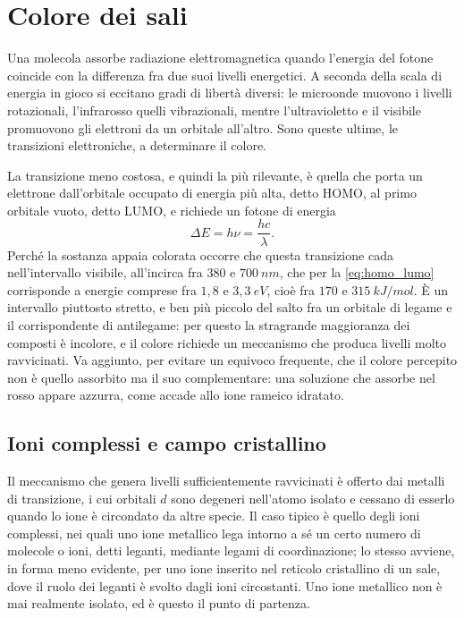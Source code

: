 \chapter{Colore dei sali}

Una molecola assorbe radiazione elettromagnetica quando l'energia del fotone coincide con la differenza fra due suoi livelli energetici.
A seconda della scala di energia in gioco si eccitano gradi di libertà diversi: le microonde muovono i livelli rotazionali, l'infrarosso quelli vibrazionali, mentre l'ultravioletto e il visibile promuovono gli elettroni da un orbitale all'altro.
Sono queste ultime, le transizioni elettroniche, a determinare il colore.

La transizione meno costosa, e quindi la più rilevante, è quella che porta un elettrone dall'orbitale occupato di energia più alta, detto HOMO, al primo orbitale vuoto, detto LUMO, e richiede un fotone di energia
\begin{equation}
    \Delta E = h\nu = \frac{hc}{\lambda} .
    \label{eq:homo_lumo}
\end{equation}
Perché la sostanza appaia colorata occorre che questa transizione cada nell'intervallo visibile, all'incirca fra $380$ e $700 \ nm$, che per la \eqref{eq:homo_lumo} corrisponde a energie comprese fra $1{,}8$ e $3{,}3 \ eV$, cioè fra $170$ e $315 \ kJ/mol$.
È un intervallo piuttosto stretto, e ben più piccolo del salto fra un orbitale di legame e il corrispondente di antilegame: per questo la stragrande maggioranza dei composti è incolore, e il colore richiede un meccanismo che produca livelli molto ravvicinati.
Va aggiunto, per evitare un equivoco frequente, che il colore percepito non è quello assorbito ma il suo complementare: una soluzione che assorbe nel rosso appare azzurra, come accade allo ione rameico idratato.

\section{Ioni complessi e campo cristallino}

Il meccanismo che genera livelli sufficientemente ravvicinati è offerto dai metalli di transizione, i cui orbitali $d$ sono degeneri nell'atomo isolato e cessano di esserlo quando lo ione è circondato da altre specie.
Il caso tipico è quello degli ioni complessi, nei quali uno ione metallico lega intorno a sé un certo numero di molecole o ioni, detti leganti, mediante legami di coordinazione; lo stesso avviene, in forma meno evidente, per uno ione inserito nel reticolo cristallino di un sale, dove il ruolo dei leganti è svolto dagli ioni circostanti.
Uno ione metallico non è mai realmente isolato, ed è questo il punto di partenza.

